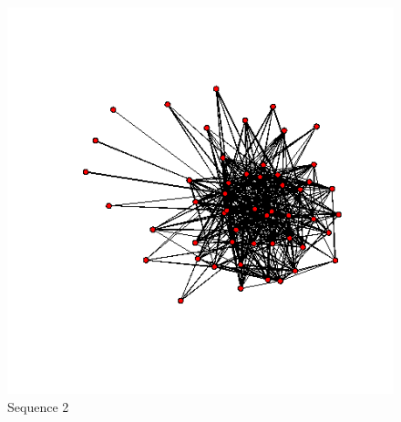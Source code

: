 \documentclass[aspectratio=169,ignorenonframetext,9pt]{beamer}
\theoremstyle{plain}
\theoremstyle{definition}
\begin{document}
\begin{figure}[h]
\begin{center}
    \includegraphics[scale=0.23]{pictures/f2_19_nework.png}
    \caption{Sequence 2}
    \end{center}
\end{figure}
\end{document}
